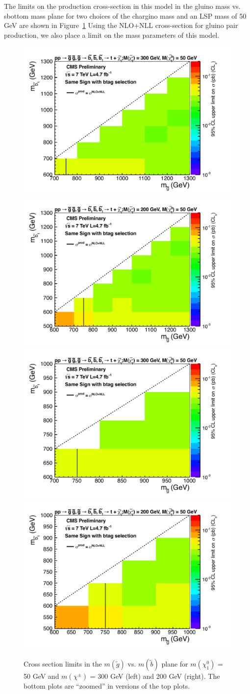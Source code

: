 The limits on the production cross-section in this model in the 
gluino mass vs. sbottom mass plane for two choices of the 
chargino mass and an LSP mass of 50 GeV 
are shown in Figure~\ref{fig:mglinoSbottom}
Using the 
NLO$+$NLL cross-section for gluino pair production, we also place a limit
on the mass parameters of this model.


\begin{figure}[htb]
\begin{center}
\includegraphics[width=0.47\linewidth]{figs/gl_sb_300_50.pdf}
\includegraphics[width=0.47\linewidth]{figs/gl_sb_200_50.pdf}
\includegraphics[width=0.47\linewidth]{figs/gl_sb_300_50_zoom.pdf}
\includegraphics[width=0.47\linewidth]{figs/gl_sb_200_50_zoom.pdf}
\caption{Cross section limits in the $m(\widetilde{g})$ vs. 
$m(\widetilde{b})$ plane
for $m(\chi_1^0)$ = 50 GeV and 
$m(\chi^{\pm})$ = 300 GeV (left) and 200 GeV (right). 
The bottom plots are ``zoomed'' in versions of the top plots.
\label{fig:mglinoSbottom}}
\end{center}
\end{figure}

